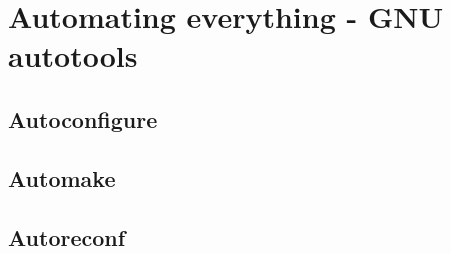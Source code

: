 
\section{Automating everything - GNU autotools}
\label{autotools}

\subsection{Autoconfigure}

\subsection{Automake}

\subsection{Autoreconf}
